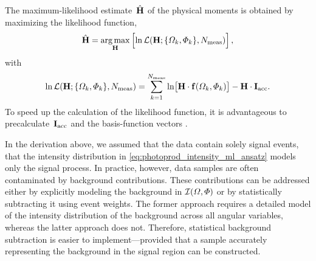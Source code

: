 The maximum-likelihood estimate~$\hat{\bm{\mathrm{H}}}$ of the physical
moments is obtained by maximizing the likelihood function, \ie
\begin{equation}
  \label{eq:photoprod_moments_mle}
  \hat{\vect{H}}
  = \argmax_{\vect{H}}\sBrk[2]{\ln \mathcal{L}(\vect{H}; \set{\Omega_k, \Phi_k}, N_\text{meas})},
\end{equation}
with
\begin{equation}
  \label{eq:photoprod_likelihood_3}
  \ln \mathcal{L}(\vect{H}; \set{\Omega_k, \Phi_k}, N_\text{meas})
  = \sum_{k = 1}^{N_\text{meas}} \ln\!\sBrk[1]{\vect{H} \cdot \vect{f}(\Omega_k, \Phi_k)}
  - \vect{H} \cdot \vect{I}_\text{acc}.
\end{equation}
To speed up the calculation of the likelihood function, it is
advantageous to precalculate~$\bm{\mathrm{I}}_\text{acc}$ and the
basis-function vectors .

In the derivation above, we assumed that the data contain solely
signal events, \ie that the intensity distribution in
\cref{eq:photoprod_intensity_ml_ansatz} models only the signal
process.  In practice, however, data samples are often contaminated by
background contributions.  These contributions can be addressed either
by explicitly modeling the background in $\mathcal{I}(\Omega, \Phi)$ or
by statistically subtracting it using event weights.  The former
approach requires a detailed model of the intensity distribution of
the background across all angular variables, whereas the latter
approach does not.  Therefore, statistical background subtraction is
easier to implement---provided that a sample accurately representing
the background in the signal region can be constructed.

